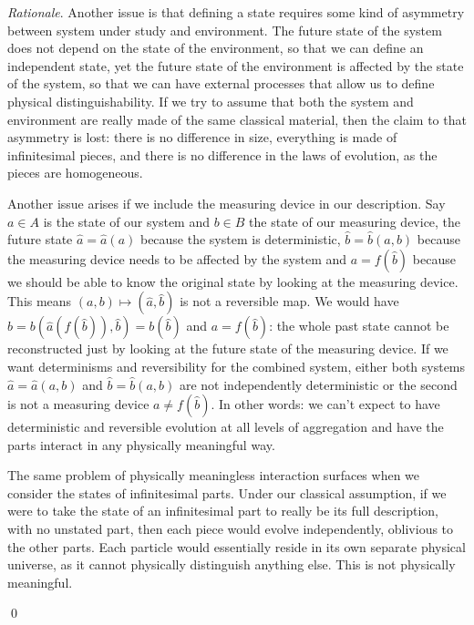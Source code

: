 \documentclass[aps,pra,10pt,twocolumn,floatfix,nofootinbib]{revtex4-1}
\numberwithin{equation}{section}
\theoremstyle{definition}
\newenvironment{rationale}{\emph{Rationale}.}{\qed}
\begin{document}
\begin{rationale}
	Another issue is that defining a state requires some kind of asymmetry between system under study and environment. The future state of the system does not depend on the state of the environment, so that we can define an independent state, yet the future state of the environment is affected by the state of the system, so that we can have external processes that allow us to define physical distinguishability. If we try to assume that both the system and environment are really made of the same classical material, then the claim to that asymmetry is lost: there is no difference in size, everything is made of infinitesimal pieces, and there is no difference in the laws of evolution, as the pieces are homogeneous.
	
	Another issue arises if we include the measuring device in our description. Say $a \in A$ is the state of our system and $b \in B$ the state of our measuring device, the future state $\hat{a}=\hat{a}(a)$ because the system is deterministic, $\hat{b}=\hat{b}(a,b)$ because the measuring device needs to be affected by the system and $a=f(\hat{b})$ because we should be able to know the original state by looking at the measuring device. This means $(a, b) \mapsto (\hat{a}, \hat{b})$ is not a reversible map. We would have $b = b(\hat{a}(f(\hat{b})), \hat{b}) = b(\hat{b})$ and $a=f(\hat{b})$: the whole past state cannot be reconstructed just by looking at the future state of the measuring device. If we want determinisms and reversibility for the combined system, either both systems $\hat{a}=\hat{a}(a, b)$ and $\hat{b}=\hat{b}(a, b)$ are not independently deterministic or the second is not a measuring device $a \neq f(\hat{b})$. In other words: we can't expect to have deterministic and reversible evolution at all levels of aggregation and have the parts interact in any physically meaningful way.
	
	The same problem of physically meaningless interaction surfaces when we consider the states of infinitesimal parts. Under our classical assumption, if we were to take the state of an infinitesimal part to really be its full description, with no unstated part, then each piece would evolve independently, oblivious to the other parts. Each particle would essentially reside in its own separate physical universe, as it cannot physically distinguish anything else. This is not physically meaningful.
	

\end{rationale}
\end{document}
